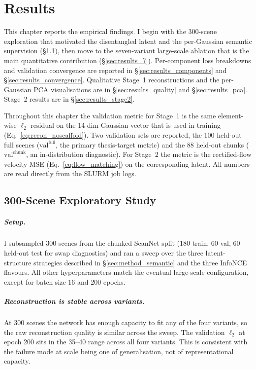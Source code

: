 \chapter{Results}
\label{chap:results}

This chapter reports the empirical findings. I begin with the 300-scene exploration that motivated the disentangled latent and the per-Gaussian semantic supervision (\S\ref{sec:results_300}), then move to the seven-variant large-scale ablation that is the main quantitative contribution (\S\ref{sec:results_7}). Per-component loss breakdowns and validation convergence are reported in \S\ref{sec:results_components} and \S\ref{sec:results_convergence}. Qualitative Stage~1 reconstructions and the per-Gaussian PCA visualisations are in \S\ref{sec:results_quality} and \S\ref{sec:results_pca}. Stage~2 results are in \S\ref{sec:results_stage2}.

Throughout this chapter the validation metric for Stage~1 is the same element-wise $\ell_2$ residual on the 14-dim Gaussian vector that is used in training (Eq.~\eqref{eq:recon_noscaffold}). Two validation sets are reported, the 100 held-out full scenes ($\text{val}^{\text{full}}$, the primary thesis-target metric) and the 88 held-out chunks ($\text{val}^{\text{chunk}}$, an in-distribution diagnostic). For Stage~2 the metric is the rectified-flow velocity MSE (Eq.~\eqref{eq:flow_matching}) on the corresponding latent. All numbers are read directly from the SLURM job logs.

\section{300-Scene Exploratory Study}
\label{sec:results_300}

\paragraph{Setup.} I subsampled 300 scenes from the chunked ScanNet split (180 train, 60 val, 60 held-out test for swap diagnostics) and ran a sweep over the three latent-structure strategies described in \S\ref{sec:method_semantic} and the three InfoNCE flavours. All other hyperparameters match the eventual large-scale configuration, except for batch size 16 and 200 epochs.

\paragraph{Reconstruction is stable across variants.} At 300 scenes the network has enough capacity to fit any of the four variants, so the raw reconstruction quality is similar across the sweep. The validation $\ell_2$ at epoch 200 sits in the 35--40 range across all four variants. This is consistent with the failure mode at scale being one of generalisation, not of representational capacity.

